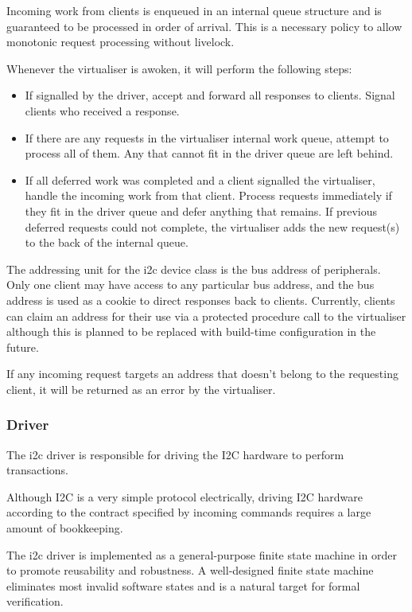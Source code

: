 \documentclass[a4paper,12pt]{report}
\begin{document}
Incoming work from clients is enqueued in an internal queue structure
and is guaranteed to be processed in order of arrival. This is a necessary policy to
allow monotonic request processing without livelock.

Whenever the virtualiser is awoken, it will perform the following steps:
\begin{itemize}
  \item If signalled by the driver, accept and forward all responses to clients. Signal
    clients who received a response.
  \item If there are any requests in the virtualiser internal work queue, attempt to process
    all of them. Any that cannot fit in the driver queue are left behind.
  \item If all deferred work was completed and a client signalled the virtualiser, handle the
    incoming work from that client. Process requests immediately if they fit in the driver queue
    and defer anything that remains. If previous deferred requests could not complete,
    the virtualiser adds the new request(s) to the back of the internal queue.
\end{itemize}

The addressing unit for the \gls{i2c} device class is the bus address of peripherals.
Only one client may have access to any particular bus address, and the bus address is
used as a cookie to direct responses back to clients. Currently, clients can claim an
address for their use via a protected procedure call to the virtualiser although this
is planned to be replaced with build-time configuration in the future.

If any incoming request targets an address that doesn't belong to the requesting client,
it will be returned as an error by the virtualiser.

\subsubsection{Driver}

The \gls{i2c} driver is responsible for driving the I2C hardware to perform transactions.

Although I2C is a very simple protocol electrically, driving I2C hardware according
to the contract specified by incoming commands requires a large amount of bookkeeping.

The \gls{i2c} driver is implemented as a general-purpose finite state machine in order
to promote reusability and robustness. A well-designed finite state machine eliminates
most invalid software states and is a natural target for formal verification.
\end{document}

